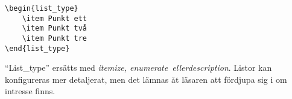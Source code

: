 \begin{verbatim}
\begin{list_type}
    \item Punkt ett
    \item Punkt två
    \item Punkt tre
\end{list_type}
\end{verbatim}

``List\_type'' ersätts med \emph{itemize, enumerate\em\ eller\em description}. Listor kan konfigureras mer detaljerat, men det lämnas åt läsaren att fördjupa sig i om intresse finns.
